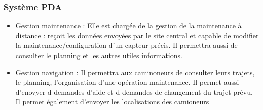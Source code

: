 \subsubsection{Système PDA}
	\begin{itemize}
	\item Gestion maintenance : Elle est chargée de la gestion de la maintenance à distance : reçoit les données envoyées par le site central et capable de modifier la maintenance/configuration d'un capteur précis. Il permettra aussi
de consulter le planning et les autres utiles informations.

	\item Gestion navigation : Il permettra aux caminoneurs de consulter leurs trajets, le planning, l'organisation d'une opération maintenance. Il permet aussi d'enovyer d demandes d'aide et d demandes de changement du trajet prévu. Il permet également d'envoyer les localisations des camioneurs

	\end{itemize}
